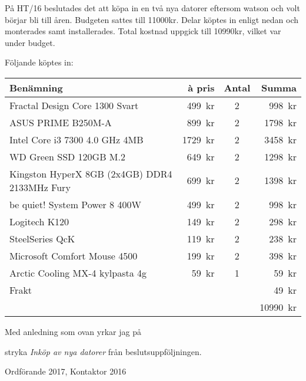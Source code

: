 \documentclass[../_main/handlingar.tex]{subfiles}
\begin{document}
På HT/16 beslutades det att köpa in en två nya datorer eftersom watson och volt börjar bli till åren. Budgeten sattes till 11000kr. Delar köptes in enligt nedan och monterades samt installerades. Total kostnad uppgick till 10990kr, vilket var under budget.

Följande köptes in:
\begin{table}[H]
\begin{tabular}{lrcr}
    \textbf{Benämning} & \textbf{\`a pris} & \textbf{Antal} & \textbf{Summa} \\
    \hline
    Fractal Design Core 1300 Svart & \SI{499}{kr} & 2 & \SI{998}{kr} \\
    ASUS PRIME B250M-A & \SI{899}{kr} & 2 & \SI{1798}{kr} \\
    Intel Core i3 7300 4.0 GHz 4MB & \SI{1729}{kr} & 2 & \SI{3458}{kr} \\
    WD Green SSD 120GB M.2 & \SI{649}{kr} & 2 & \SI{1298}{kr} \\
    Kingston HyperX 8GB (2x4GB) DDR4 2133MHz Fury & \SI{699}{kr} & 2 & \SI{1398}{kr} \\
    be quiet! System Power 8 400W & \SI{499}{kr} & 2 & \SI{998}{kr} \\
    Logitech K120 & \SI{149}{kr} & 2 & \SI{298}{kr} \\
    SteelSeries QcK & \SI{119}{kr} & 2 & \SI{238}{kr} \\
    Microsoft Comfort Mouse 4500 & \SI{199}{kr} & 2 & \SI{398}{kr} \\
    Arctic Cooling MX-4 kylpasta 4g & \SI{59}{kr} & 1 & \SI{59}{kr} \\
    Frakt & & & \SI{49}{kr}\\
    \hline
    & & & \SI{10990}{kr}\\
\end{tabular}
\end{table}

Med anledning som ovan yrkar jag på

\begin{attsatser}
    \att stryka \emph{Inköp av nya datorer} från beslutsuppföljningen.
\end{attsatser}

\begin{signatures}{1}
    \mvh
    \signature{Erik Månsson}{Ordförande 2017, Kontaktor 2016}
\end{signatures}
\end{document}

